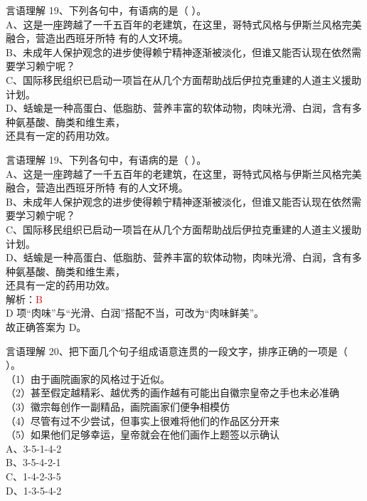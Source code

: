 \documentclass[aspectratio=169]{beamer}
\begin{document}
\begin{frame}[t]{言语理解}
    19、下列各句中，有语病的是（ ）。\\
    A、这是一座跨越了一千五百年的老建筑，在这里，哥特式风格与伊斯兰风格完美融合，营造出西班牙所特
    有的人文环境。\\
    B、未成年人保护观念的进步使得赖宁精神逐渐被淡化，但谁又能否认现在依然需要学习赖宁呢？\\
    C、国际移民组织已启动一项旨在从几个方面帮助战后伊拉克重建的人道主义援助计划。\\
    D、蛞蝓是一种高蛋白、低脂肪、营养丰富的软体动物，肉味光滑、白润，含有多种氨基酸、酶类和维生素，\\
    还具有一定的药用功效。\\
\end{frame}


\begin{frame}[t]{言语理解}
    19、下列各句中，有语病的是（ ）。\\
    A、这是一座跨越了一千五百年的老建筑，在这里，哥特式风格与伊斯兰风格完美融合，营造出西班牙所特
    有的人文环境。\\
    B、未成年人保护观念的进步使得赖宁精神逐渐被淡化，但谁又能否认现在依然需要学习赖宁呢？\\
    C、国际移民组织已启动一项旨在从几个方面帮助战后伊拉克重建的人道主义援助计划。\\
    D、蛞蝓是一种高蛋白、低脂肪、营养丰富的软体动物，肉味光滑、白润，含有多种氨基酸、酶类和维生素，\\
    还具有一定的药用功效。\\
    解析：\textcolor{red}{B}\\
    D 项“肉味”与“光滑、白润”搭配不当，可改为“肉味鲜美”。\\
    故正确答案为 D。\\
\end{frame}




\begin{frame}[t]{言语理解}
    20、把下面几个句子组成语意连贯的一段文字，排序正确的一项是（ ）。\\
    （1）由于画院画家的风格过于近似。\\
    （2）甚至假定越精彩、越优秀的画作越有可能出自徽宗皇帝之手也未必准确\\
    （3）徽宗每创作一副精品，画院画家们便争相模仿\\
    （4）尽管有过不少尝试，但事实上很难将他们的作品区分开来\\
    （5）如果他们足够幸运，皇帝就会在他们画作上题签以示确认\\
    A、3-5-1-4-2\\
    B、3-5-4-2-1\\
    C、1-4-2-3-5\\
    D、1-3-5-4-2\\
\end{frame}
\end{document}
